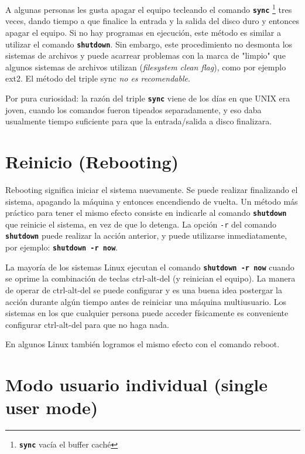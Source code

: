 \documentclass[12pt]{article}
\begin{document}
 A algunas personas les gusta apagar el equipo tecleando el comando
\texttt{\textbf{sync}}
		\footnote{\texttt{\textbf{sync}} vacía el buffer caché}
		tres veces, dando tiempo a que
		finalice la entrada y la salida del disco duro y entonces apagar
		el equipo. Si no hay programas en ejecución, este método es
		similar a utilizar el comando \texttt{\textbf{shutdown}}. Sin
		embargo, este procedimiento no desmonta los sistemas de archivos
		y puede acarrear problemas con la marca de "limpio" que algunos
		sistemas de archivos utilizan (\textit{filesystem clean
		flag}), como por ejemplo ext2. El método del triple sync
		\textit{no es recomendable}.  

 Por pura curiosidad: la razón del triple \texttt{\textbf{sync}} viene de
los días en que UNIX era joven, cuando los comandos fueron tipeados
separadamente, y eso daba usualmente tiempo suficiente para que la
entrada/salida a disco finalizara.  



\section{ Reinicio (Rebooting)}

 Rebooting significa iniciar el sistema nuevamente. Se puede realizar
finalizando el sistema, apagando la máquina y entonces encendiendo de vuelta. Un
método más práctico para tener el mismo efecto consiste en indicarle al comando
\texttt{\textbf{shutdown}} que reinicie el sistema, en vez de que lo detenga.
La opción \texttt{-r} del comando \texttt{\textbf{shutdown}} puede
realizar la acción anterior, y puede utilizarse inmediatamente, por ejemplo:
\texttt{\textbf{shutdown -r now}}.  

 La mayoría de los sistemas Linux ejecutan el comando \texttt{\textbf{shutdown -r
now}} cuando se oprime la combinación de teclas ctrl-alt-del (y
reinician el equipo). La manera de operar de ctrl-alt-del se puede configurar y
es una buena idea postergar la acción durante algún tiempo antes de reiniciar
una máquina multiusuario. Los sistemas en los que cualquier persona puede
acceder físicamente es conveniente configurar ctrl-alt-del para que no haga
nada.

En algunos Linux también logramos el mismo efecto con el comando reboot.





\section{ Modo usuario individual (single user mode)}
\end{document}
